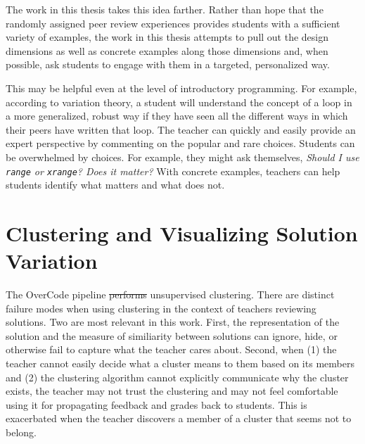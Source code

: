 \documentclass[12pt,twoside]{mitthesis}
\providecommand{\DIFaddtex}[1]{{\protect\color{blue}\uwave{#1}}} %
\providecommand{\DIFdeltex}[1]{{\protect\color{red}\sout{#1}}}                      %
\providecommand{\DIFaddbegin}{} %
\providecommand{\DIFaddend}{} %
\providecommand{\DIFdelbegin}{} %
\providecommand{\DIFdelend}{} %
\providecommand{\DIFadd}[1]{\texorpdfstring{\DIFaddtex{#1}}{#1}} %
\providecommand{\DIFdel}[1]{\texorpdfstring{\DIFdeltex{#1}}{}} %
\begin{document}
The work in this thesis takes this idea farther. Rather than hope that the randomly assigned peer review experiences provides students with a sufficient variety of examples, the work in this thesis attempts to pull out the design dimensions as well as concrete examples along those dimensions and, when possible, ask students to engage with them in a targeted, personalized way. 

This may be helpful even at the level of introductory programming. For example, according to variation theory, a student will understand the concept of a loop in a more generalized, robust way if they have seen all the different ways in which their peers have written that loop. The teacher can quickly and easily provide an expert perspective by commenting on the popular and rare choices. Students can be overwhelmed by choices. For example, they might ask themselves, {\it Should I use \texttt{range} or \texttt{xrange}? Does it matter?} With concrete examples, teachers can help students identify what matters and what does not. 



\section{Clustering and Visualizing Solution Variation}
The OverCode pipeline \DIFdelbegin \DIFdel{performs }\DIFdelend \DIFaddbegin \DIFadd{does }\DIFaddend unsupervised clustering. There are distinct failure modes when using clustering in the context of teachers reviewing solutions. Two are most relevant in this work. First, the representation of the solution and the measure of similiarity between solutions can ignore, hide, or otherwise fail to capture what the teacher cares about. Second, when (1) the teacher cannot easily decide what a cluster means to them based on its members and (2) the clustering algorithm cannot explicitly communicate why the cluster exists, the teacher may not trust the clustering and may not feel comfortable using it for propagating feedback and grades back to students. This is exacerbated when the teacher discovers a member of a cluster that seems not to belong.
\end{document}
